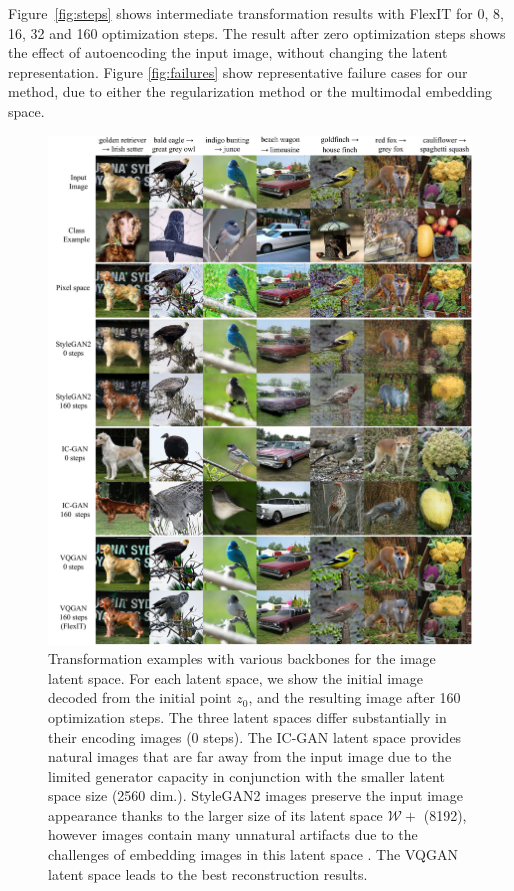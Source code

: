 Figure~\ref{fig:steps} shows intermediate transformation results with FlexIT for 0, 8, 16, 32 and 160 optimization steps. 
The result after zero optimization steps shows the effect of autoencoding the input image, without changing the latent representation.
Figure \ref{fig:failures} show representative failure cases for our method, due to either the regularization method or the multimodal embedding space.

\begin{figure}[t!]
    \centering
    \includegraphics[width=0.85\linewidth]{images/flexit/assets/encoder2.pdf}
    \caption{
    Transformation examples with various backbones for the image latent space. For each latent space, we show the initial image decoded from the initial point $z_0$, and the resulting image after 160 optimization steps. 
    The three latent spaces differ substantially in their encoding images (0 steps). The IC-GAN latent space provides natural images that are far away from the input image due to the limited generator capacity in conjunction with the smaller latent space size (2560 dim.). StyleGAN2 images preserve the input image appearance thanks to the larger size of its latent space $\mathcal{W+}$ (8192), however images contain many unnatural artifacts due to the challenges of embedding images in this latent space \cite{tov2021designing}. The VQGAN latent space leads to the best  reconstruction results.
}
\end{figure}
